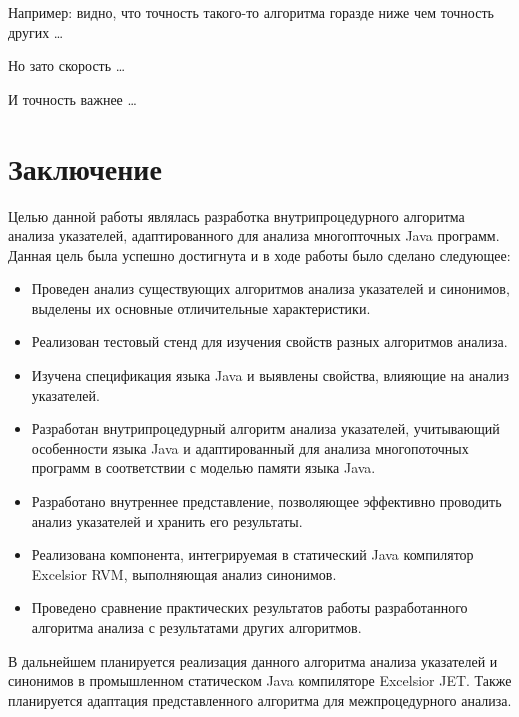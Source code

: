\documentclass[14pt,titlepage]{extarticle}
\let\oldsection\section
\renewcommand{\section}{\newpage\oldsection}
\newcommand{\sectionwithoutnumber}[1]{
  \section*{#1}
  \addcontentsline{toc}{section}{#1}
}
\begin{document}
    Например: видно, что точность такого-то алгоритма горазде ниже чем точность
    других \ldots

    Но зато скорость \ldots

    И точность важнее \ldots

  \sectionwithoutnumber{Заключение}

    Целью данной работы являлась разработка внутрипроцедурного алгоритма
    анализа указателей, адаптированного для анализа многопточных Java программ.
    Данная цель была успешно достигнута и в ходе работы было сделано следующее:
    \begin{itemize}
      \item Проведен анализ существующих алгоритмов анализа указателей и
            синонимов, выделены их основные отличительные характеристики.
      \item Реализован тестовый стенд для изучения свойств разных алгоритмов
            анализа.
      \item Изучена спецификация языка Java и выявлены свойства, влияющие на
            анализ указателей.
      \item Разработан внутрипроцедурный алгоритм анализа указателей,
            учитывающий особенности языка Java и адаптированный для анализа
            многопоточных программ в соответствии с моделью памяти языка Java.
      \item Разработано внутреннее представление, позволяющее эффективно
            проводить анализ указателей и хранить его результаты.
      \item Реализована компонента, интегрируемая в статический Java компилятор
            Excelsior RVM, выполняющая анализ синонимов.
      \item Проведено сравнение практических результатов работы разработанного
            алгоритма анализа с результатами других алгоритмов.
    \end{itemize}

    В дальнейшем планируется реализация данного алгоритма анализа указателей и
    синонимов в промышленном статическом Java компиляторе Excelsior JET.
    Также планируется адаптация представленного алгоритма для межпроцедурного
    анализа.

  \newpage
    
\end{document}
